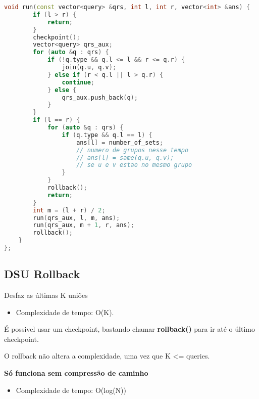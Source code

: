 \documentclass[11pt, a4paper, oneside]{book}
\begin{document}
\begin{multicols}{2}
\begin{lstlisting}[language=C++]
    void run(const vector<query> &qrs, int l, int r, vector<int> &ans) {
        if (l > r) {
            return;
        }
        checkpoint();
        vector<query> qrs_aux;
        for (auto &q : qrs) {
            if (!q.type && q.l <= l && r <= q.r) {
                join(q.u, q.v);
            } else if (r < q.l || l > q.r) {
                continue;
            } else {
                qrs_aux.push_back(q);
            }
        }
        if (l == r) {
            for (auto &q : qrs) {
                if (q.type && q.l == l) {
                    ans[l] = number_of_sets;
                    // numero de grupos nesse tempo
                    // ans[l] = same(q.u, q.v);
                    // se u e v estao no mesmo grupo
                }
            }
            rollback();
            return;
        }
        int m = (l + r) / 2;
        run(qrs_aux, l, m, ans);
        run(qrs_aux, m + 1, r, ans);
        rollback();
    }
};
\end{lstlisting}
\end{multicols}

\hfill

\subsection{DSU Rollback}


Desfaz as últimas K uniões



\begin{itemize}
\item Complexidade de tempo: O(K).
\end{itemize}



É possivel usar um checkpoint, bastando chamar \textbf{rollback()} para ir até o último checkpoint.  

O rollback não altera a complexidade, uma vez que K <= queries.  

\textbf{Só funciona sem compressão de caminho}



\begin{itemize}
\item Complexidade de tempo: O(log(N))
\end{itemize}

\hfill
\end{document}
